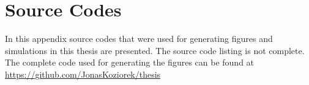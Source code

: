 \chapter{Source Codes}
\label{sec:Appendix_codes}

In this appendix source codes that were used for generating figures and simulations in this thesis are presented.
The source code listing is not complete.
The complete code used for generating the figures can be found at \url{https://github.com/JonasKoziorek/thesis}






\endinput